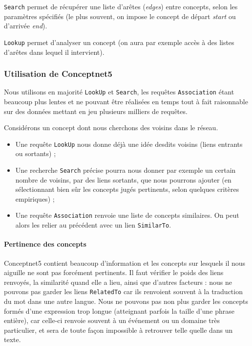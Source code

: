 \documentclass[a4paper, 12pt]{article}
\newcommand{\ang}[1]{\textit{#1}}%
\begin{document}
\texttt{Search} permet de récupérer une liste d'arêtes (\ang{edges}) entre concepts, selon les paramètres spécifiés (le plus souvent, on impose le concept de départ \ang{start} ou d'arrivée \ang{end}).

\texttt{Lookup} permet d'analyser un concept (on aura par exemple accès à des listes d'arêtes dans lequel il intervient).


\subsubsection{Utilisation de Conceptnet5}

Nous utilisons en majorité \texttt{LookUp} et \texttt{Search}, les requêtes \texttt{Association} étant beaucoup plus lentes et ne pouvant être réalisées en temps tout à fait raisonnable sur des données mettant en jeu plusieurs milliers de requêtes.

Considérons un concept dont nous cherchons des voisins dans le réseau.
\begin{itemize}
 \item Une requête \verb|LookUp| nous donne déjà une idée desdits voisins (liens entrants ou sortants) ;
 \item Une recherche \verb|Search| précise pourra nous donner par exemple un certain nombre de voisins, par des liens sortants, que nous pourrons ajouter (en sélectionnant bien sûr les concepts jugés pertinents, selon quelques critères empiriques) ;
 \item Une requête \verb|Association| renvoie une liste de concepts similaires. On peut alors les relier au précédent avec un lien \verb|SimilarTo|.
\end{itemize}

\paragraph{Pertinence des concepts}
Conceptnet5 contient beaucoup d'information et les concepts sur lesquels il nous aiguille ne sont pas forcément pertinents. Il faut vérifier le poids des liens renvoyés, la similarité quand elle a lieu, ainsi que d'autres facteurs : nous ne pouvons pas garder les liens \verb|RelatedTo| car ils renvoient souvent à la traduction du mot dans une autre langue. Nous ne pouvons pas non plus garder les concepts formés d'une expression trop longue (atteignant parfois la taille d'une phrase entière), car celle-ci renvoie souvent à un événement ou un domaine très particulier, et sera de toute façon impossible à retrouver telle quelle dans un texte.
\end{document}
